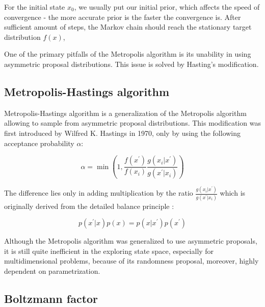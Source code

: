 \documentclass[
  digital, %
  oneside, %
  lof,     %
  lot,     %
]{fithesis4}
\begin{document}
For the initial state 
$x_0$, we usually put our initial prior, 
which affects the speed of convergence - 
the more accurate prior is the faster the 
convergence is.
After sufficient amount of steps, the Markov 
chain should reach the stationary target 
distribution $f(x)$,

One of the primary pitfalls of the Metropolis algorithm is
its unability in using asymmetric proposal distributions.
This issue is solved by Hasting's modification.


\subsection{Metropolis-Hastings algorithm}

Metropolis-Hastings algorithm is a generalization
of the Metropolis algorithm allowing to sample from
asymmetric proposal distributions.
This modification was first introduced by 
Wilfred K. Hastings in 1970, only by 
using the following acceptance probability $\alpha$:

\begin{equation}\label{eq:metropolis-hastings-alpha}
  \alpha = \min \left(1, \frac{f(x^{\prime})}{f(x_{i})} \frac{g(x_{i} | x^{\prime})}{g(x^{\prime} | x_{i})}\right)  
\end{equation}

The difference lies only in adding multiplication
by the ratio $\frac{g(x_{i} | x^{\prime})}{g(x^{\prime} | x_{i})}$
which is originally derived from the detailed 
balance principle \cite[Chapter 11]{owen2013}:

\begin{equation}
  p(x^\prime | x) p(x) = p(x | x^\prime) p(x^\prime)
\end{equation}

Although the Metropolis algorithm was generalized to
use asymmetric proposals, it is still quite inefficient
in the exploring state space, especially for
multidimensional problems, because of its 
randomness proposal, moreover, highly dependent 
on parametrization.


\subsection{Boltzmann factor}
\label{sec:boltzmann-factor}
\end{document}
